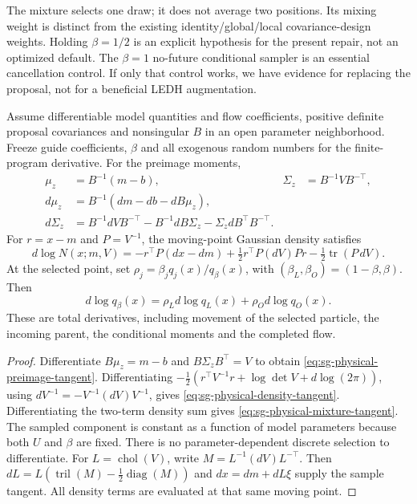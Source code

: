 The mixture selects one draw; it does not average two positions. Its mixing
weight is distinct from the existing identity/global/local covariance-design
weights. Holding $\beta=1/2$ is an explicit hypothesis for the present repair,
not an optimized default. The $\beta=1$ no-future conditional sampler is an
essential cancellation control. If only that control works, we have evidence
for replacing the proposal, not for a beneficial LEDH augmentation.

\begin{proposition}
\label{prop:sg-physical-tangent}
Assume differentiable model quantities and flow coefficients, positive
definite proposal covariances and nonsingular $B$ in an open parameter
neighborhood. Freeze guide coefficients, $\beta$ and all exogenous random
numbers for the finite-program derivative. For the preimage moments,
\begin{align}
 \mu_z&=B^{-1}(m-b), & \Sigma_z&=B^{-1}VB^{-\top},\\
 d\mu_z&=B^{-1}(dm-db-dB\mu_z),\label{eq:sg-physical-preimage-tangent}\\
 d\Sigma_z&=B^{-1}dVB^{-\top}-B^{-1}dB\Sigma_z
                  -\Sigma_z dB^\top B^{-\top}.\nonumber
\end{align}
For $r=x-m$ and $P=V^{-1}$, the moving-point Gaussian density satisfies
\begin{equation}
 d\log N(x;m,V)=-r^\top P(dx-dm)
 +\tfrac12 r^\top P(dV)Pr-\tfrac12\operatorname{tr}(P\,dV).
 \label{eq:sg-physical-density-tangent}
\end{equation}
At the selected point, set
$\rho_j=\beta_jq_j(x)/q_\beta(x)$, with
$(\beta_L,\beta_O)=(1-\beta,\beta)$. Then
\begin{equation}
 d\log q_\beta(x)=\rho_Ld\log q_L(x)+\rho_Od\log q_O(x).
 \label{eq:sg-physical-mixture-tangent}
\end{equation}
These are total derivatives, including movement of the selected particle,
the incoming parent, the conditional moments and the completed flow.
\end{proposition}
\begin{proof}
Differentiate $B\mu_z=m-b$ and $B\Sigma_zB^\top=V$ to obtain
\eqref{eq:sg-physical-preimage-tangent}. Differentiating
$-\tfrac12(r^\top V^{-1}r+\log\det V+d\log(2\pi))$, using
$dV^{-1}=-V^{-1}(dV)V^{-1}$, gives
\eqref{eq:sg-physical-density-tangent}. Differentiating the two-term density
sum gives \eqref{eq:sg-physical-mixture-tangent}. The sampled component is
constant as a function of model parameters because both $U$ and $\beta$
are fixed. There is no parameter-dependent discrete selection to differentiate.
For $L=\operatorname{chol}(V)$, write
$M=L^{-1}(dV)L^{-\top}$. Then
$dL=L(\operatorname{tril}(M)-\tfrac12\operatorname{diag}(M))$ and
$dx=dm+dL\xi$ supply the sample tangent. All density terms are evaluated
at that same moving point.
\end{proof}

